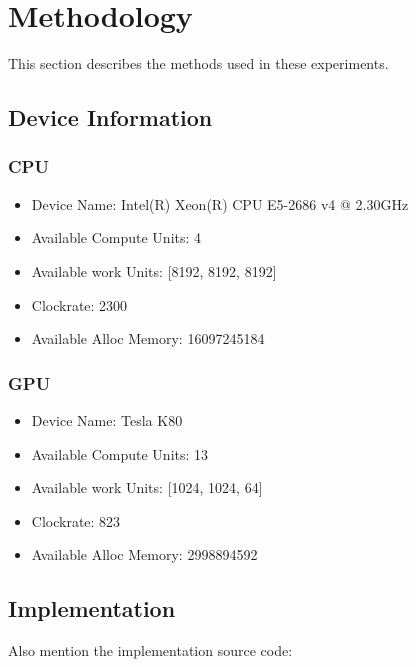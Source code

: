 \section{Methodology}
This section describes the methods used in these experiments.

\subsection{Device Information}

\subsubsection{CPU}
\begin{itemize}
	\item Device Name: Intel(R) Xeon(R) CPU E5-2686 v4 @ 2.30GHz
	\item Available Compute Units: 4
	\item Available work Units: [8192, 8192, 8192]
	\item Clockrate: 2300
	\item Available Alloc Memory: 16097245184\\
\end{itemize}


\subsubsection{GPU}
\begin{itemize}
	\item Device Name: Tesla K80
	\item Available Compute Units: 13
	\item Available work Units: [1024, 1024, 64]
	\item Clockrate: 823
	\item Available Alloc Memory: 2998894592
\end{itemize}

\subsection{Implementation}
Also mention the implementation source code:


